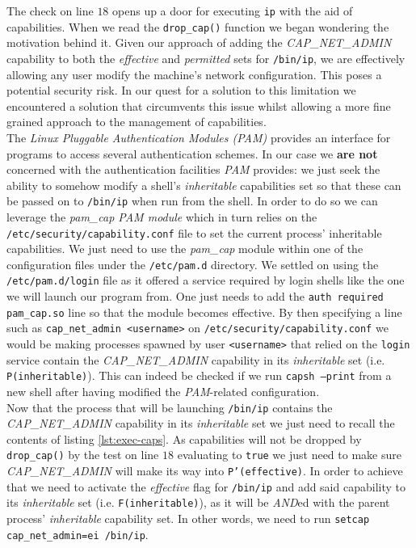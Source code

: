         

        The check on line $18$ opens up a door for executing \texttt{ip} with the aid of capabilities. When we read the \texttt{drop\_cap()} function we began wondering the motivation behind it. Given our approach of adding the \textit{CAP\_NET\_ADMIN} capability to both the \textit{effective} and \textit{permitted} sets for \texttt{/bin/ip}, we are effectively allowing any user modify the machine's network configuration. This poses a potential security risk. In our quest for a solution to this limitation we encountered a solution that circumvents this issue whilst allowing a more fine grained approach to the management of capabilities.\\

        The \textit{Linux Pluggable Authentication Modules (PAM)} \cite{bib:man-pam} provides an interface for programs to access several authentication schemes. In our case we \textbf{are not} concerned with the authentication facilities \textit{PAM} provides: we just seek the ability to somehow modify a shell's \textit{inheritable} capabilities set so that these can be passed on to \texttt{/bin/ip} when run from the shell. In order to do so we can leverage the \textit{pam\_cap PAM module} \cite{bib:man-pam-cap} which in turn relies on the \texttt{/etc/security/capability.conf} file to set the current process' inheritable capabilities. We just need to use the \textit{pam\_cap} module within one of the configuration files under the \texttt{/etc/pam.d} directory. We settled on using the \texttt{/etc/pam.d/login} file as it offered a service required by login shells like the one we will launch our program from. One just needs to add the \texttt{auth required pam\_cap.so} line so that the module becomes effective. By then specifying a line such as \texttt{cap\_net\_admin  <username>} on \texttt{/etc/security/capability.conf} we would be making processes spawned by user \texttt{<username>} that relied on the \texttt{login} service contain the \textit{CAP\_NET\_ADMIN} capability in its \textit{inheritable} set (i.e. \texttt{P(inheritable)}). This can indeed be checked if we run \texttt{capsh --print} from a new shell after having modified the \textit{PAM}-related configuration.\\

        Now that the process that will be launching \texttt{/bin/ip} contains the \textit{CAP\_NET\_ADMIN} capability in its \textit{inheritable} set we just need to recall the contents of listing \ref{lst:exec-caps}. As capabilities will not be dropped by \texttt{drop\_cap()} by the test on line $18$ evaluating to \texttt{true} we just need to make sure \textit{CAP\_NET\_ADMIN} will make its way into \texttt{P'(effective)}. In order to achieve that we need to activate the \textit{effective} flag for \texttt{/bin/ip} and add said capability to its \textit{inheritable} set (i.e. \texttt{F(inheritable)}), as it will be \textit{AND}ed with the parent process' \textit{inheritable} capability set. In other words, we need to run \texttt{setcap cap\_net\_admin=ei /bin/ip}.\\

